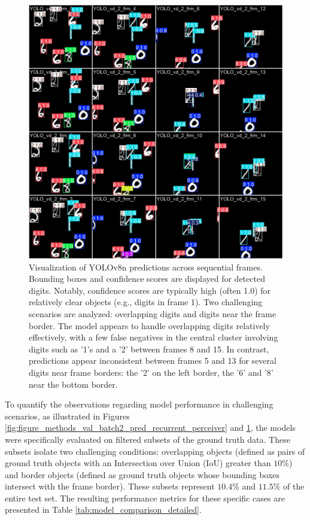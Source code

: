 \begin{figure}
    \centering
    \includegraphics[width=\textwidth]{figures/figure_methods_val_batch2_pred_YOLO.jpg}
    \caption{Visualization of YOLOv8n \cite{Jocher_Ultralytics_YOLO_2023} predictions across sequential frames. Bounding boxes and confidence scores are displayed for detected digits. Notably, confidence scores are typically high (often 1.0) for relatively clear objects (e.g., digits in frame 1). Two challenging scenarios are analyzed: overlapping digits and digits near the frame border. The model appears to handle overlapping digits relatively effectively, with a few false negatives in the central cluster involving digits such as '1's and a '2' between frames 8 and 15. In contrast, predictions appear inconsistent between frames 5 and 13 for several digits near frame borders: the '2' on the left border, the '6' and '8' near the bottom border.}
    \label{fig:figure_methods_val_batch2_pred_YOLO}
\end{figure}

To quantify the observations regarding model performance in challenging scenarios, as illustrated in Figures \ref{fig:figure_methods_val_batch2_pred_recurrent_perceiver} and \ref{fig:figure_methods_val_batch2_pred_YOLO}, the models were specifically evaluated on filtered subsets of the ground truth data. These subsets isolate two challenging conditions: overlapping objects (defined as pairs of ground truth objects with an Intersection over Union (IoU) greater than $10\%$) and border objects (defined as ground truth objects whose bounding boxes intersect with the frame border). These subsets represent $10.4\%$ and $11.5\%$ of the entire test set. The resulting performance metrics for these specific cases are presented in Table \ref{tab:model_comparison_detailed}.

